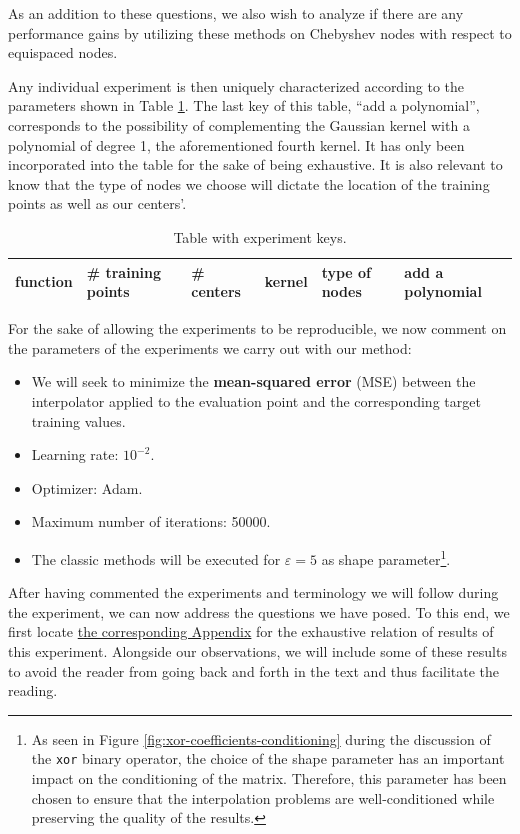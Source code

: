 \documentclass[12pt]{report} %
\begin{document}
As an addition to these questions, we also wish to analyze if there are any performance gains by utilizing these
methods on Chebyshev nodes with respect to equispaced nodes.

Any individual experiment is then uniquely
characterized according to the parameters shown in Table \ref{tab:keys-table}. The last key of this table, ``add a polynomial'', corresponds to the possibility of complementing the Gaussian kernel with a polynomial of degree 1, the aforementioned fourth kernel. It has only been incorporated into the table for the sake of being exhaustive. It is also relevant to know that the type of nodes we choose will dictate the location of the training points as well as our centers'.

\begin{table}[h]
  \centering
  \begin{tabular}{|l|l|l|l|l|l|}
    \hline
    function & \# training points & \# centers & kernel & type of nodes &
    add a polynomial                                                      \\
    \hline
  \end{tabular}
  \caption{Table with experiment keys.}
  \label{tab:keys-table}
\end{table}

For the sake of allowing the experiments to be reproducible, we now comment on the parameters of the experiments we carry out with our method: \begin{itemize}
  \item We will seek to minimize the \textbf{mean-squared error} (MSE) between the interpolator applied to the evaluation point and the corresponding target training values.
  \item Learning rate: $10^{-2}$.
  \item Optimizer: Adam.
  \item Maximum number of iterations: 50000.
  \item The classic methods will be executed for $\varepsilon=5$ as shape parameter\footnote{As seen in Figure \ref{fig:xor-coefficients-conditioning} during the discussion of the \texttt{xor} binary operator, the choice of the shape parameter has an important impact on the conditioning of the matrix. Therefore, this parameter has been chosen to ensure that the interpolation problems are well-conditioned while preserving the quality of the results.}.
\end{itemize}

After having commented the experiments and terminology we will follow during the experiment, we can now address the questions we have posed. To this end, we first locate \hyperref[appendix-1d]{the corresponding Appendix} for the exhaustive relation of results of this experiment. Alongside our observations, we will include some of these results to avoid the reader from going back and forth in the text and thus facilitate the reading.
\end{document}
